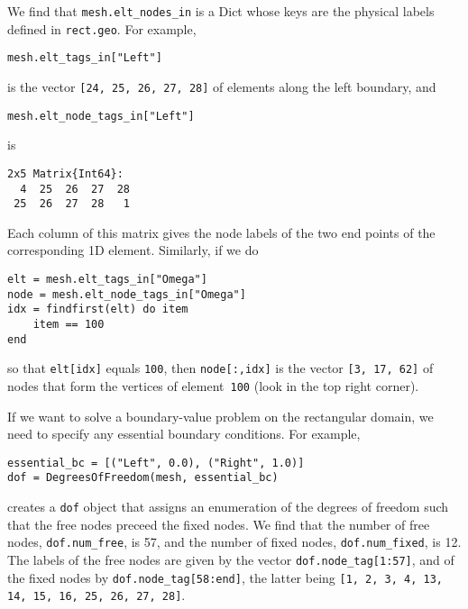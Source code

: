 \documentclass[a4paper,10pt]{article}
\begin{document}
We find that \texttt{mesh.elt\_nodes\_in} is a Dict whose keys are the physical 
labels defined in \texttt{rect.geo}.  For example, 
\begin{lstlisting}
mesh.elt_tags_in["Left"]
\end{lstlisting}
is the vector \texttt{[24, 25, 26, 27, 28]} of elements along the left 
boundary, and
\begin{lstlisting}
mesh.elt_node_tags_in["Left"]
\end{lstlisting}
is 
\begin{lstlisting}
2x5 Matrix{Int64}:
  4  25  26  27  28
 25  26  27  28   1
\end{lstlisting}
Each column of this matrix gives the node labels of the two end points of 
the corresponding 1D element.  Similarly, if we do
\begin{lstlisting}
elt = mesh.elt_tags_in["Omega"]
node = mesh.elt_node_tags_in["Omega"]
idx = findfirst(elt) do item
    item == 100
end 
\end{lstlisting}
so that \texttt{elt[idx]} equals \texttt{100}, then \texttt{node[:,idx]} is the 
vector \texttt{[3, 17, 62]} of nodes that form the vertices of 
element~\texttt{100} (look in the top right corner).

If we want to solve a boundary-value problem on the rectangular domain, we need 
to specify any essential boundary conditions.   For example, 
\begin{lstlisting}
essential_bc = [("Left", 0.0), ("Right", 1.0)] 
dof = DegreesOfFreedom(mesh, essential_bc)
\end{lstlisting}
creates a \texttt{dof} object that assigns an enumeration of the degrees of
freedom such that the free nodes preceed the fixed nodes.  We find that the
number of free nodes, \texttt{dof.num\_free}, is 57, and the number of fixed
nodes, \texttt{dof.num\_fixed}, is 12.  The labels of the free nodes are given
by the vector \texttt{dof.node\_tag[1:57]}, and of the fixed nodes by
\texttt{dof.node\_tag[58:end]}, the latter being \texttt{[1, 2, 3, 4, 13, 14, 
15, 16, 25, 26, 27, 28]}.

\end{document}

